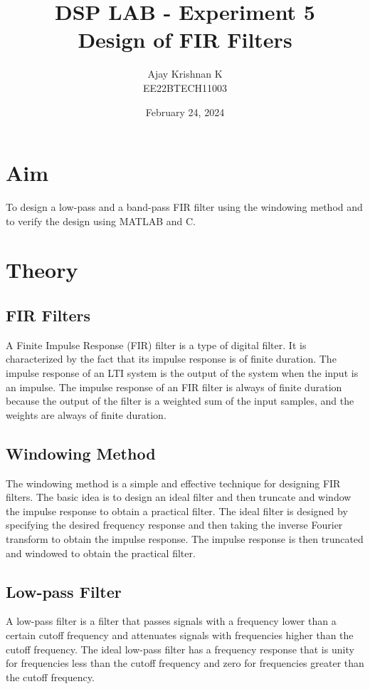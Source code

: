 \documentclass[a4paper,12pt]{article}
\title{\textbf{DSP LAB - Experiment 5} \\
        \vspace*{0.3em}
        \large{Design of FIR Filters}}
\author{Ajay Krishnan K \\  EE22BTECH11003}
\date{February 24, 2024}
\begin{document}
\maketitle

\section*{Aim}
To design a low-pass and a band-pass FIR filter 
using the windowing method and to verify the design using MATLAB and C.

\section*{Theory}
\subsection*{FIR Filters}
A Finite Impulse Response (FIR) filter is a type of digital filter. 
It is characterized by the fact that its impulse response is of finite 
duration. The impulse response of an LTI system is the output of the 
system when the input is an impulse. The impulse response of an FIR filter
 is always of finite duration because the output of the filter is a 
 weighted sum of the input samples, and the weights are always of finite
  duration.

\subsection*{Windowing Method}
The windowing method is a simple and effective technique for designing
FIR filters. The basic idea is to design an ideal filter and then
truncate and window the impulse response to obtain a practical filter.
The ideal filter is designed by specifying the desired frequency response
and then taking the inverse Fourier transform to obtain the impulse response.
The impulse response is then truncated and windowed to obtain the practical
filter.

\subsection*{Low-pass Filter}
A low-pass filter is a filter that passes signals with a frequency lower
than a certain cutoff frequency and attenuates signals with frequencies
higher than the cutoff frequency. The ideal low-pass filter has a frequency
response that is unity for frequencies less than the cutoff frequency and
zero for frequencies greater than the cutoff frequency.
\end{document}
